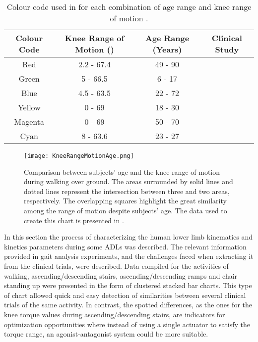 \begin{table}[htb!]
\caption{Colour code used in  for each combination of age range and knee range of motion  \cite{solis2017characterization}.}
\label{tbl:KneeRangeMotionage}
\begin{tabular}{c|c|c|c}
\hline
Colour Code & Knee Range of Motion (\degree{}) & Age Range (Years) & Clinical Study \\
\hline
Red         & 2.2 - 67.4               & 49 - 90           & \cite{rowe2000knee}       \\
Green       & 5 - 66.5                 & 6 - 17            & \cite{bovi2011multiple}        \\
Blue        & 4.5 - 63.5               & 22 - 72           & \cite{bovi2011multiple}           \\
Yellow      & 0 - 69                   & 18 - 30           & \cite{lee2008biomechanics}        \\
Magenta     & 0 - 69                   & 50 - 70           & \cite{lee2008biomechanics}     \\
Cyan        & 8 - 63.6                 & 23 - 27           & \cite{han2011biomechanical}    \\  
\hline
\end{tabular}
\end{table}

\begin{figure}[htb!]
    \centering
    \texttt{[image: KneeRangeMotionAge.png]}
    \caption{Comparison between subjects' age and the knee range of motion during walking over ground. The areas surrounded by solid lines and dotted lines represent the intersection between three and two areas, respectively. The overlapping squares highlight the great similarity among the range of motion despite subjects' age. The data used to create this chart is presented in  \cite{solis2017characterization}. }
    \label{fig:KneeRangeAge}
\end{figure}

In this section the process of characterizing the human lower limb kinematics and kinetics parameters during some ADLs was described. The relevant information provided in gait analysis experiments, and the challenges faced when extracting it from the clinical trials, were described. Data compiled for the activities of walking, ascending/descending stairs, ascending/descending ramps and chair standing up were presented in the form of clustered stacked bar charts. This type of chart allowed quick and easy detection of similarities between several clinical trials of the same activity. In contrast, the spotted differences, as the ones for the knee torque values during ascending/descending stairs, are indicators for optimization opportunities where instead of using a single actuator to satisfy the torque range, an agonist-antagonist system could be more suitable.

